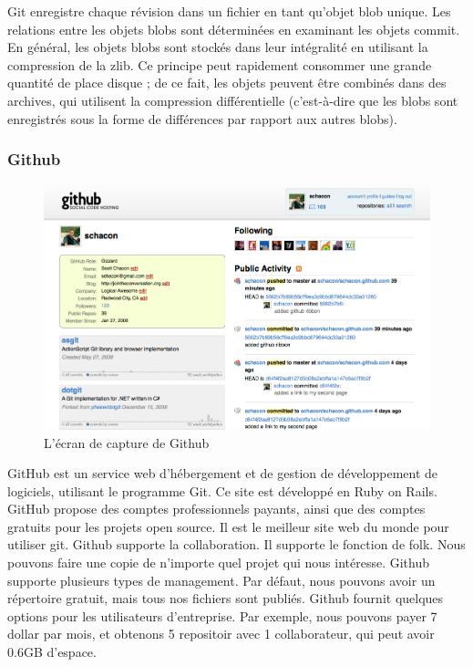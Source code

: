 Git enregistre chaque révision dans un fichier en tant qu'objet blob unique. Les relations entre les objets blobs sont déterminées en examinant les objets commit. En général, les objets blobs sont stockés dans leur intégralité en utilisant la compression de la zlib. Ce principe peut rapidement consommer une grande quantité de place disque ; de ce fait, les objets peuvent être combinés dans des archives, qui utilisent la compression différentielle (c'est-à-dire que les blobs sont enregistrés sous la forme de différences par rapport aux autres blobs).

\subsubsection{Github} %


\begin{figure}[htbp]
	\centering
		\includegraphics[width=6in]{Image/githubCapture.png}
	\caption{L'écran de capture de Github}
	\label{fig:Image_githubCapture}
\end{figure}


GitHub est un service web d'hébergement et de gestion de développement de logiciels, utilisant le programme Git. Ce site est développé en Ruby on Rails. GitHub propose des comptes professionnels payants, ainsi que des comptes gratuits pour les projets open source. Il est le meilleur site web du monde pour utiliser git. Github supporte la collaboration. Il supporte le fonction de folk. Nous pouvons faire une copie de n'importe quel projet qui nous intéresse. Github supporte plusieurs types de management. Par défaut, nous pouvons avoir un répertoire gratuit, mais tous nos fichiers sont publiés. Github fournit quelques options pour les utilisateurs d'entreprise. Par exemple, nous pouvons payer 7 dollar par mois, et obtenons 5 repositoir avec 1 collaborateur, qui peut avoir 0.6GB d'espace. 

